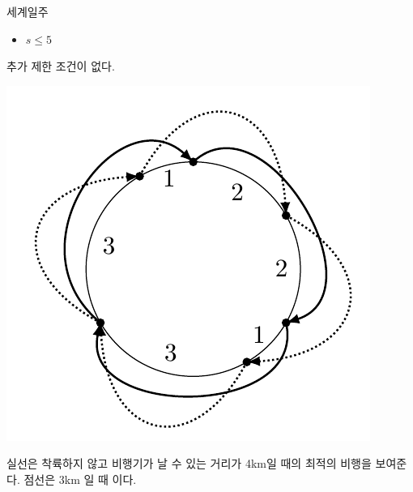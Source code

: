 \begin{problem}{세계일주}
	\begin{itemize}
		\item $s \le 5$
	\end{itemize}
	
	추가 제한 조건이 없다.
	
	
	
	\Examples
	
	\begin{example}
\end{example}

\Note
\includegraphics[]{doo.png}

실선은 착륙하지 않고 비행기가 날 수 있는 거리가 4km일 때의 최적의 비행을 보여준다. 점선은 3km 일 때 이다.
\end{problem}

